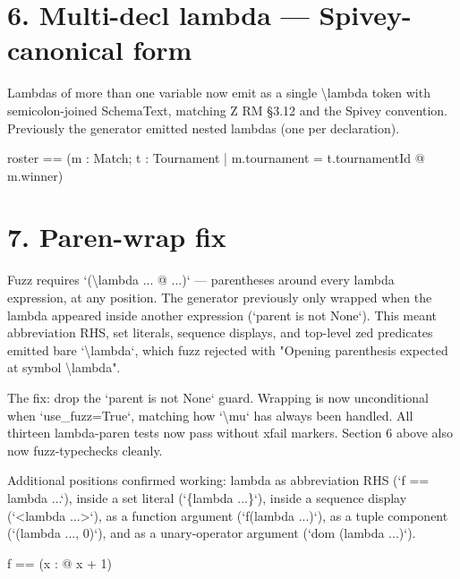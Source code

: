 \documentclass[a4paper,10pt,fleqn]{article}
\begin{document}
\section*{6. Multi-decl lambda --- Spivey-canonical form}

\noindent Lambdas of more than one variable now emit as a single \textbackslash{}lambda token with semicolon-joined SchemaText, matching Z RM §3.12 and the Spivey convention. Previously the generator emitted nested lambdas (one per declaration).

\bigskip

\begin{zed}
roster == (\lambda m : Match; t : Tournament | m.tournament = t.tournamentId @ m.winner)
\end{zed}

\section*{7. Paren-wrap fix}

\noindent Fuzz requires `(\textbackslash{}lambda ... @ ...)` --- parentheses around every lambda expression, at any position. The generator previously only wrapped when the lambda appeared inside another expression (`parent is not None`). This meant abbreviation RHS, set literals, sequence displays, and top-level zed predicates emitted bare `\textbackslash{}lambda`, which fuzz rejected with "Opening parenthesis expected at symbol \textbackslash{}lambda".

\bigskip

\medskip

\noindent The fix: drop the `parent is not None` guard. Wrapping is now unconditional when `use\_fuzz=True`, matching how `\textbackslash{}mu` has always been handled. All thirteen lambda-paren tests now pass without xfail markers. Section 6 above also now fuzz-typechecks cleanly.

\bigskip

\medskip

\noindent Additional positions confirmed working: lambda as abbreviation RHS (`f == lambda ...`), inside a set literal (`\{lambda ...\}`), inside a sequence display (`<lambda ...>`), as a function argument (`f(lambda ...)`), as a tuple component (`(lambda ..., 0)`), and as a unary-operator argument (`dom (lambda ...)`).

\bigskip

\begin{zed}
f == (\lambda x : \nat @ x + 1)
\end{zed}
\end{document}
